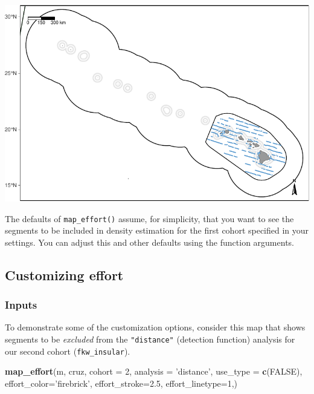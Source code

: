 \documentclass[
]{book}
\newenvironment{Shaded}{\begin{snugshade}}{\end{snugshade}}
\newcommand{\DataTypeTok}[1]{\textcolor[rgb]{0.13,0.29,0.53}{#1}}
\newcommand{\DecValTok}[1]{\textcolor[rgb]{0.00,0.00,0.81}{#1}}
\newcommand{\FloatTok}[1]{\textcolor[rgb]{0.00,0.00,0.81}{#1}}
\newcommand{\KeywordTok}[1]{\textcolor[rgb]{0.13,0.29,0.53}{\textbf{#1}}}
\newcommand{\NormalTok}[1]{#1}
\newcommand{\OtherTok}[1]{\textcolor[rgb]{0.56,0.35,0.01}{#1}}
\newcommand{\StringTok}[1]{\textcolor[rgb]{0.31,0.60,0.02}{#1}}
\begin{document}
\includegraphics{figures/unnamed-chunk-58-1.pdf}

The defaults of \texttt{map\_effort()} assume, for simplicity, that you want to see the segments to be included in density estimation for the first cohort specified in your settings. You can adjust this and other defaults using the function arguments.

\hypertarget{customizing-effort}{%
\subsection*{Customizing effort}\label{customizing-effort}}

\hypertarget{inputs}{%
\subsubsection*{Inputs}\label{inputs}}

To demonstrate some of the customization options, consider this map that shows segments to be \emph{excluded} from the \texttt{"distance"} (detection function) analysis for our second cohort (\texttt{fkw\_insular}).

\begin{Shaded}
\begin{Highlighting}[]
\KeywordTok{map_effort}\NormalTok{(m, cruz,}
           \DataTypeTok{cohort =} \DecValTok{2}\NormalTok{,}
           \DataTypeTok{analysis =} \StringTok{'distance'}\NormalTok{,}
           \DataTypeTok{use_type =} \KeywordTok{c}\NormalTok{(}\OtherTok{FALSE}\NormalTok{),}
           \DataTypeTok{effort_color=}\StringTok{'firebrick'}\NormalTok{,}
           \DataTypeTok{effort_stroke=}\FloatTok{2.5}\NormalTok{,}
           \DataTypeTok{effort_linetype=}\DecValTok{1}\NormalTok{,)}
\end{Highlighting}
\end{Shaded}
\end{document}
